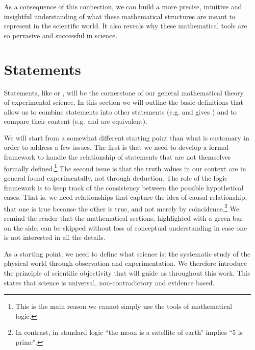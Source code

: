 \documentclass[11pt,letterpaper,fleqn]{memoir} %
\begin{document}
As a consequence of this connection, we can build a more precise, intuitive and insightful understanding of what these mathematical structures are meant to represent in the scientific world. It also reveals why these mathematical tools are so pervasive and successful in science.

\section{Statements}

Statements, like  or , will be the cornerstone of our general mathematical theory of experimental science. In this section we will outline the basic definitions that allow us to combine statements into other statements (e.g.  and  gives ) and to compare their content (e.g.  and  are equivalent).

We will start from a somewhat different starting point than what is customary in order to address a few issues. The first is that we need to develop a formal framework to handle the relationship of statements that are not themselves formally defined.\footnote{This is the main reason we cannot simply use the tools of mathematical logic.} The second issue is that the truth values in our context are in general found experimentally, not through deduction. The role of the logic framework is to keep track of the consistency between the possible hypothetical cases. That is, we need relationships that capture the idea of causal relationship, that one is true because the other is true, and not merely by coincidence.\footnote{In contrast, in standard logic ``the moon is a satellite of earth" implies ``5 is prime".} We remind the reader that the mathematical sections, highlighted with a green bar on the side, can be skipped without loss of conceptual understanding in case one is not interested in all the details. 

As a starting point, we need to define what science is: the systematic study of the physical world through observation and experimentation. We therefore introduce the principle of scientific objectivity that will guide us throughout this work. This states that science is universal, non-contradictory and evidence based.
\end{document}
